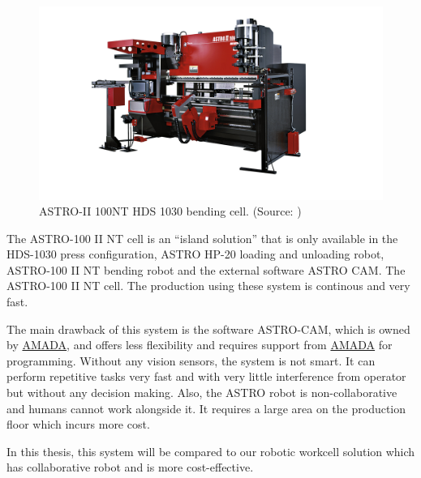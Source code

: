 \begin{figure}[h]
    \centering
    \includegraphics[width=\textwidth]{figures/ASTRO-100.jpg}
    \caption{ASTRO-II 100NT HDS 1030 bending cell. (Source: \cite{astro100})}
    \label{fig:astro}
\end{figure}

The ASTRO-100 II NT cell is an “island solution” that is only available in the HDS-1030 press configuration, ASTRO HP-20 loading and unloading robot, ASTRO-100 II NT bending robot and the external software ASTRO CAM.
The ASTRO-100 II NT cell. \cite{astro100} The production using these system is continous and very fast.


The main drawback of this system is the software ASTRO-CAM, which is owned by \hyperref[acro:AMADA]{AMADA}, and offers less flexibility and requires support from \hyperref[acro:AMADA]{AMADA} for programming. Without any vision sensors, the system is not smart. It can perform repetitive tasks very fast and with very little interference from operator but without any decision making. Also, the ASTRO robot is non-collaborative and humans cannot work alongside it.
It requires a large area on the production floor which incurs more cost.

In this thesis, this system will be compared to our robotic workcell solution which has collaborative robot and is more cost-effective.
